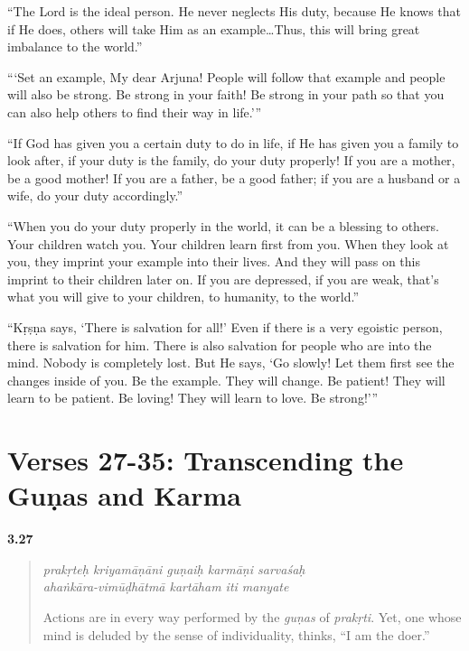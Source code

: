 \enquote{The Lord is the ideal person. He never neglects His duty, because He knows that if He does, others will take Him as an example\ldots Thus, this will bring great imbalance to the world.}

\enquote{\enquote{Set an example, My dear Arjuna! People will follow that example and people will also be strong. Be strong in your faith! Be strong in your path so that you can also help others to find their way in life.}}

\enquote{If God has given you a certain duty to do in life, if He has given you a family to look after, if your duty is the family, do your duty properly! If you are a mother, be a good mother! If you are a father, be a good father; if you are a husband or a wife, do your duty accordingly.}

\enquote{When you do your duty properly in the world, it can be a blessing to others. Your children watch you. Your children learn first from you. When they look at you, they imprint your example into their lives. And they will pass on this imprint to their children later on. If you are depressed, if you are weak, that’s what you will give to your children, to humanity, to the world.}

\enquote{Kṛṣṇa says, \enquote{There is salvation for all!} Even if there is a very egoistic person, there is salvation for him. There is also salvation for people who are into the mind. Nobody is completely lost. But He says, \enquote{Go slowly! Let them first see the changes inside of you. Be the example. They will change. Be patient! They will learn to be patient. Be loving! They will learn to love. Be strong!}}

\newpage
\section{Verses 27-35: Transcending the Guṇas and Karma}\label{sec-verses-27-35-transcending-the-gunas-and-karma}

\par\noindent\textbf{3.27}\par
\begin{verse}
\textit{prakṛteḥ kriyamāṇāni guṇaiḥ karmāṇi sarvaśaḥ} \\
\textit{ahaṅkāra-vimūḍhātmā kartāham iti manyate}

\noindent Actions are in every way performed by the \textit{guṇas} of \textit{prakṛti}. Yet, one whose mind is deluded by the sense of individuality, thinks, \enquote{I am the doer.}
\end{verse}
\par



